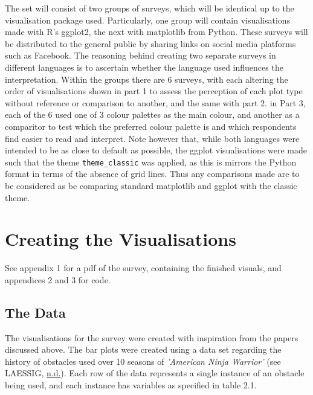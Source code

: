 \documentclass[
  11pt,
]{book}
\begin{document}
The set will consist of two groups of surveys, which will be identical
up to the visualisation package used. Particularly, one group will
contain visualisations made with R's ggplot2, the next with matplotlib
from Python. These surveys will be distributed to the general public by
sharing links on social media platforms such as Facebook. The reasoning
behind creating two separate surveys in different languages is to
ascertain whether the language used influences the interpretation.
Within the groups there are 6 surveys, with each altering the order of
visualisations shown in part 1 to assess the perception of each plot
type without reference or comparison to another, and the same with part
2. in Part 3, each of the 6 used one of 3 colour palettes as the main
colour, and another as a comparitor to test which the preferred colour
palette is and which respondents find easier to read and interpret. Note
however that, while both languages were intended to be as close to
default as possible, the ggplot visualisations were made such that the
theme \texttt{theme\_classic} was applied, as this is mirrors the Python
format in terms of the absence of grid lines. Thus any comparisons made
are to be considered as be comparing standard matplotlib and ggplot with
the classic theme.

\section{Creating the Visualisations}

See appendix 1 for a pdf of the survey, containing the finished visuals,
and appendices 2 and 3 for code.

\subsection{The Data}

The visualisations for the survey were created with inspiration from the
papers discussed above. The bar plots were created using a data set
regarding the history of obstacles used over 10 seasons of
\textit{'American Ninja Warrior'} (see LAESSIG,
\protect\hyperlink{ref-ANW}{n.d.}). Each row of the data represents a
single instance of an obstacle being used, and each instance has
variables as specified in table 2.1.
\end{document}
